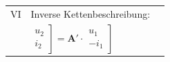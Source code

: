 \documentclass[6pt,a4paper]{scrartcl}
\newcommand{\ma}[1]{\ensuremath{{\boldsymbol {#1}}}}
\begin{document}
\begin{multicols}{3}
\begin{tabular}{cll}
	VI & Inverse Kettenbeschreibung:\\
	& $\left.\begin{matrix} u_2\\ i_2\end{matrix}\right]=\ma{A'} \cdot \left.\begin{matrix} u_1\\ -i_1 \end{matrix}\right]$\\
	\end{tabular}

\end{multicols}

\end{document}
